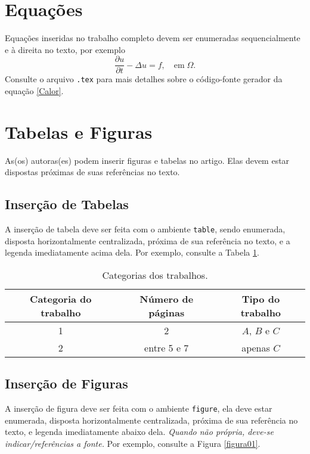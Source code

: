 \documentclass{pssbmac}
\begin{document}
\section{Equações}

Equações inseridas no trabalho completo devem ser enumeradas sequencialmente e à direita no texto, por exemplo
\begin{equation}
\frac{\partial u}{\partial t}-\Delta u = f, \quad  \mathrm{em} \; \Omega. \label{Calor}
\end{equation}
Consulte o arquivo \verb!.tex! para mais detalhes sobre o código-fonte gerador da equação \eqref{Calor}.

\section{Tabelas e Figuras}

As(os) autoras(es) podem inserir figuras e tabelas no artigo. Elas devem estar dispostas próximas de suas referências no texto.

\subsection{Inserção de Tabelas}

A inserção de tabela deve ser feita com o ambiente \verb!table!, sendo enumerada, disposta horizontalmente centralizada, próxima de sua referência no texto, e a legenda imediatamente acima dela. Por exemplo, consulte a Tabela \ref{tabela01}.

\begin{table}[H]
\caption{ {\small Categorias dos trabalhos.}}
\centering
\begin{tabular}{ccc}
\hline
Categoria do trabalho  & Número de páginas & Tipo do trabalho\\ \hline
1          & 2  & $A$, $B$ e $C$    \\
2          & entre 5 e 7  & apenas $C$ \\
\hline
\end{tabular}\label{tabela01}
\end{table}

\subsection{Inserção de Figuras}

A inserção de figura deve ser feita com o ambiente \verb!figure!, ela deve estar enumerada, disposta horizontalmente centralizada, próxima de sua referência no texto, e legenda imediatamente abaixo dela. \emph{Quando não própria, deve-se indicar/referências a fonte.} Por exemplo, consulte a Figura \ref{figura01}.
\end{document}
